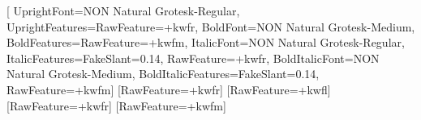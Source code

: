 \setmainfont{NON Natural Grotesk-Regular}[
  UprightFont={NON Natural Grotesk-Regular}, UprightFeatures={RawFeature={+kwfr}},
  BoldFont={NON Natural Grotesk-Medium}, BoldFeatures={RawFeature={+kwfm}},
  ItalicFont={NON Natural Grotesk-Regular}, ItalicFeatures={FakeSlant=0.14, RawFeature={+kwfr}},
  BoldItalicFont={NON Natural Grotesk-Medium}, BoldItalicFeatures={FakeSlant=0.14, RawFeature={+kwfm}}]
\setsansfont{NON Natural Grotesk-Regular}[RawFeature={+kwfr}]
\newfontfamily{}
\newfontfamily{}[RawFeature={+kwfl}]
\newfontfamily{}[RawFeature={+kwfr}]
\newfontfamily{}[RawFeature={+kwfm}]
\newfontfamily{}
\newcommand{\kwsize}[2]{\fontsize{#1}{#2}\selectfont}
